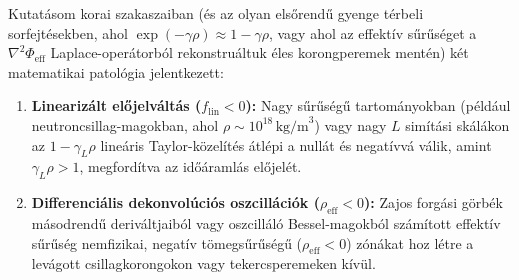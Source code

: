 
\par
Kutat\'asom korai szakaszaiban (\'es az olyan els\H{o}rend\H{u} gyenge t\'erbeli sorfejt\'esekben, ahol $\exp(-\gamma\rho) \approx 1 - \gamma\rho$, vagy ahol az effekt\'iv s\H{u}r\H{u}s\'eget a $\nabla^2\Phi_{\text{eff}}$ Laplace-oper\'atorb\'ol rekonstru\'altuk \'eles korongperemek ment\'en) k\'et matematikai patol\'ogia jelentkezett:
\begin{enumerate}\setlength{\itemsep}{1pt}\setlength{\parskip}{0pt}\setlength{\topsep}{1pt}
  \item \textbf{Lineariz\'alt el\H{o}jelv\'alt\'as ($f_{\text{lin}} < 0$):} Nagy s\H{u}r\H{u}s\'eg\H{u} tartom\'anyokban (p\'eld\'aul neutroncsillag-magokban, ahol $\rho \sim 10^{18}\,\text{kg/m}^3$) vagy nagy $L$ sim\'it\'asi sk\'al\'akon az $1 - \gamma_L\rho$ line\'aris Taylor-k\"ozel\'it\'es \'atlépi a null\'at \'es negat\'ivv\'a v\'alik, amint $\gamma_L\rho > 1$, megford\'itva az id\H{o}\'araml\'as el\H{o}jel\'et.
  \item \textbf{Differenci\'alis dekonvol\'uci\'os oszcill\'aci\'ok ($\rho_{\text{eff}} < 0$):} Zajos forg\'asi g\"orb\'ek m\'asodrend\H{u} deriv\'altjaib\'ol vagy oszcill\'al\'o Bessel-magokb\'ol sz\'am\'itott effekt\'iv s\H{u}r\H{u}s\'eg nemfizikai, negat\'iv t\"omegs\H{u}r\H{u}s\'eg\H{u} ($\rho_{\text{eff}} < 0$) z\'on\'akat hoz l\'etre a lev\'agott csillagkorongokon vagy tekercsperemeken k\'iv\"ul.
\end{enumerate}

